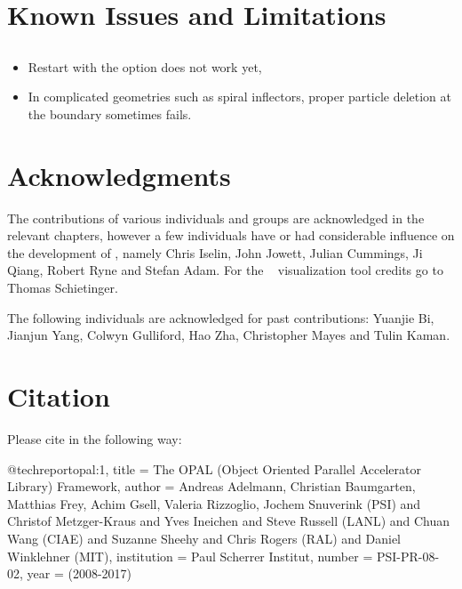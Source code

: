 \section{Known Issues and Limitations}
\subsection{\opalcycl}
\begin{itemize}
    \item Restart with the option  does not work yet,
    \item In complicated geometries such as spiral inflectors, proper particle deletion at the boundary sometimes fails.
\end{itemize}
\section{Acknowledgments}
The contributions of various individuals and groups are acknowledged in the relevant chapters, however a few individuals have or had considerable influence on the
development of \opal, namely Chris Iselin, John Jowett, Julian Cummings, Ji Qiang, Robert Ryne and Stefan Adam. For the \partroot~ visualization tool credits go to Thomas Schietinger.

The following
individuals are acknowledged for past contributions: Yuanjie Bi, Jianjun Yang, Colwyn Gulliford, Hao Zha, Christopher Mayes and Tulin Kaman.

\section{Citation}
Please cite \opal in the following way:
\begin{example}
@techreport{opal:1,
title = {The OPAL (Object Oriented Parallel Accelerator Library) Framework},
author = {Andreas Adelmann, Christian Baumgarten, Matthias Frey, Achim Gsell, Valeria Rizzoglio, 
Jochem Snuverink (PSI) and Christof Metzger-Kraus and Yves Ineichen and 
Steve Russell (LANL) and Chuan Wang (CIAE) and 
Suzanne Sheehy and Chris Rogers (RAL) and
Daniel Winklehner (MIT)},
institution = {Paul Scherrer Institut},
number = {PSI-PR-08-02},
year = {(2008-2017)}
}
\end{example}



